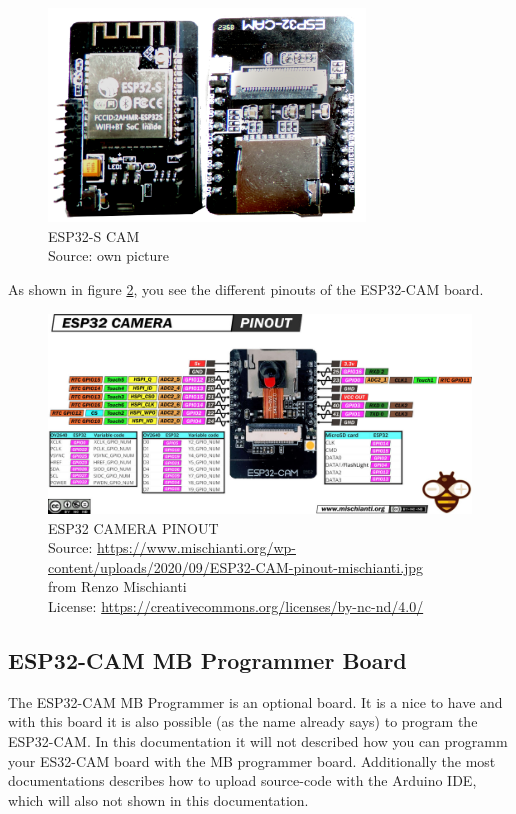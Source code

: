 \begin{figure}[H]
\centering
\includegraphics[width=0.75\textwidth]{esp32-s_overview}
\caption[ESP32-S-CAM Overview]{ESP32-S CAM \\ Source: own picture}
\label{ESP32-S-CAM-overview}
\end{figure}

As shown in figure \ref{ESP32-CAM-pinout}, you see the different pinouts of the ESP32-CAM board.

\begin{figure}[H]
\centering
\includegraphics[width=\textwidth]{ESP32-CAM-pinout-mischianti}
\caption[ESP32 CAMERA PINOUT Overview]{ESP32 CAMERA PINOUT \\ Source: \url{https://www.mischianti.org/wp-content/uploads/2020/09/ESP32-CAM-pinout-mischianti.jpg}\\ from Renzo Mischianti \\ License: \url{https://creativecommons.org/licenses/by-nc-nd/4.0/}}
\label{ESP32-CAM-pinout}
\end{figure}

\subsection{ESP32-CAM MB Programmer Board}
The ESP32-CAM MB Programmer is an optional board. It is a nice to have and with this board it is also possible (as the name already says) to program the ESP32-CAM. In this documentation it will not described how you can programm your ES32-CAM board with the MB programmer board. Additionally the most documentations describes how to upload source-code with the Arduino IDE, which will also not shown in this documentation.

